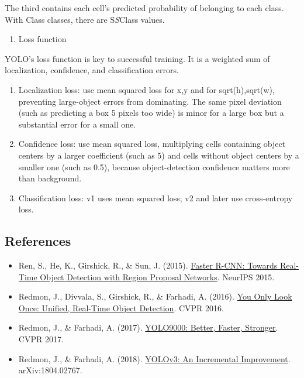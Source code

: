 The third contains each cell's predicted probability of belonging to each class. With Class classes, there are S\emph{S}Class values.

\begin{enumerate}
\def\labelenumi{\arabic{enumi}.}
\setcounter{enumi}{2}
\tightlist
\item
  Loss function
\end{enumerate}

YOLO's loss function is key to successful training. It is a weighted sum of localization, confidence, and classification errors.

\begin{enumerate}
\def\labelenumi{(\arabic{enumi})}
\item
  Localization loss: use mean squared loss for x,y and for sqrt(h),sqrt(w), preventing large-object errors from dominating. The same pixel deviation (such as predicting a box 5 pixels too wide) is minor for a large box but a substantial error for a small one.
\item
  Confidence loss: use mean squared loss, multiplying cells containing object centers by a larger coefficient (such as 5) and cells without object centers by a smaller one (such as 0.5), because object-detection confidence matters more than background.
\item
  Classification loss: v1 uses mean squared loss; v2 and later use cross-entropy loss.
\end{enumerate}

\FloatBarrier
{}
\hypertarget{references-16}{%
\subsection{References}\label{references-16}}

\vspace{0.25em}
\begin{itemize}
\tightlist
\item
  Ren, S., He, K., Girshick, R., \& Sun, J. (2015). \href{https://proceedings.neurips.cc/paper/2015/hash/14bfa6bb14875e45bba028a21ed38046-Abstract.html}{Faster R-CNN: Towards Real-Time Object Detection with Region Proposal Networks}. NeurIPS 2015.
\item
  Redmon, J., Divvala, S., Girshick, R., \& Farhadi, A. (2016). \href{https://arxiv.org/abs/1506.02640}{You Only Look Once: Unified, Real-Time Object Detection}. CVPR 2016.
\item
  Redmon, J., \& Farhadi, A. (2017). \href{https://arxiv.org/abs/1612.08242}{YOLO9000: Better, Faster, Stronger}. CVPR 2017.
\item
  Redmon, J., \& Farhadi, A. (2018). \href{https://arxiv.org/abs/1804.02767}{YOLOv3: An Incremental Improvement}. arXiv:1804.02767.
\end{itemize}

\clearpage
